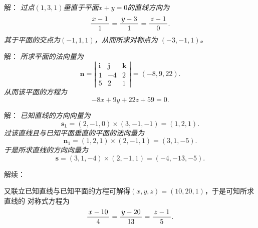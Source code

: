 \begin{frame}
	\linespread{1.5}
	
	
	\small 解：\it
	过点$(1,3,1)$垂直于平面$x+y=0$的直线方向为
	$$\displaystyle\frac{\,{x-1}\,}{\,{1}\,}=\displaystyle\frac{\,{y-3}\,}{\,{1}\,}=\displaystyle\frac{\,{z-1}\,}{\,{0}\,}.$$
	其于平面的交点为$(-1,1,1)$，从而所求对称点为
	$(-3,-1,1)$。\fin
\end{frame}

\begin{frame}
	\linespread{1.5}
	
	\bigskip
	
	\small 解：\it
	所求平面的法向量为
	$$\bm{n}=\left|\begin{array}{ccc}
		\bm{i} & \bm{j} & \bm{k}\\
		1 & -4 & 2 \\
		5 & 2 & 1
	\end{array}\right|=(-8,9,22).$$
	从而该平面的方程为
	$$-8x+9y+22z+59=0.$$
	\fin
\end{frame}

\begin{frame}
	\linespread{1.5}
	
	\bigskip
	
	\small 解：\it
	已知直线的方向向量为
	$$\bm{s_1}=(2,-1,0)\times(3,-1,-1)=(1,2,1).$$
	过该直线且与已知平面垂直的平面的法向量为
	$$\bm{n}_1=(1,2,1)\times(2,-1,1)=(3,1,-5).$$
	于是所求直线的方向向量为
	$$\bm{s}=(3,1,-4)\times(2,-1,1)=(-4,-13,-5).$$
\end{frame}


\begin{frame}
	\linespread{1.5}
	
	\bigskip
	
	\small 解续：\it
	
	又联立已知直线与已知平面的方程可解得$(x,y,z)=(10,20,1)$，于是可知所求直线的
	对称式方程为
	$$\displaystyle\frac{\,{x-10}\,}{\,{4}\,}=\displaystyle\frac{\,{y-20}\,}{\,{13}\,}=\displaystyle\frac{\,{z-1}\,}{\,{5}\,}.$$
	\fin
\end{frame}


